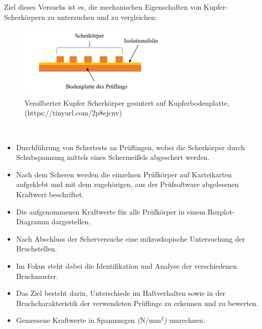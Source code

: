 Ziel dieses Versuchs ist es, die mechanischen Eigenschaften von Kupfer-Scherkörpern zu untersuchen und zu vergleichen:
\\
\vspace{0.05cm}
\begin{figure}[h]
    \centering
    \includegraphics[scale=0.95]{Bilder/schematik.png}
    \caption{Versilberter Kupfer Scherkörper gesintert auf Kupferbodenplatte, (https://tinyurl.com/2p8ejcnv)}
    \vspace{0.2cm}
    \label{Abb.2: Versilberter Kupfer Scherkörper gesintert auf Kupferbodenplatte} 
\end{figure}\\

\begin{itemize}
\item Durchführung von Schertests an Prüflingen, wobei die Scherkörper durch Schubspannung mittels eines Schermeißels abgeschert werden.
\item Nach dem Scheren werden die einzelnen Prüfkörper auf Karteikarten aufgeklebt und mit dem zugehörigen, aus der Prüfsoftware abgelesenen Kraftwert beschriftet.
\item Die aufgenommenen Kraftwerte für alle Prüfkörper in einem Boxplot-Diagramm dargestellen.
\item Nach Abschluss der Scherversuche eine mikroskopische Untersuchung der Bruchstellen.
\item Im Fokus steht dabei die Identifikation und Analyse der verschiedenen Bruchmuster.
\item Das Ziel besteht darin, Unterschiede im Haftverhalten sowie in der Bruchcharakteristik der verwendeten Prüflinge zu erkennen und zu bewerten.
\item Gemessene Kraftwerte in Spannungen \textit{($\mathrm{N/mm^2}$)}  umrechnen.
\end{itemize}
